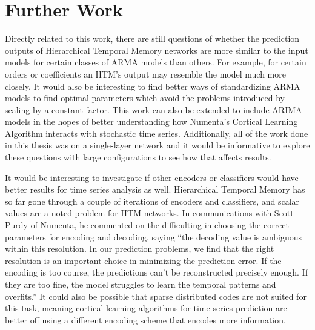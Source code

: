 \documentclass[oneside,12pt,openany]{book}
\begin{document}
	
	\chapter{Further Work}

	Directly related to this work, there are still questions of whether the prediction outputs of Hierarchical Temporal Memory networks are more similar to the input models for certain classes of ARMA models than others. For example, for certain orders or coefficients an HTM's output may resemble the model much more closely. It would also be interesting to find better ways of standardizing ARMA models to find optimal parameters which avoid the problems introduced by scaling by a constant factor. This work can also be extended to include ARIMA models in the hopes of better understanding how Numenta's Cortical Learning Algorithm interacts with stochastic time series. Additionally, all of the work done in this thesis was on a single-layer network and it would be informative to explore these questions with large configurations to see how that affects results.
    
    It would be interesting to investigate if other encoders or classifiers would have better results for time series analysis as well. Hierarchical Temporal Memory has so far gone through a couple of iterations of encoders and classifiers, and scalar values are a noted problem for HTM networks. In communications with Scott Purdy of Numenta, he commented on the difficulting in choosing the correct parameters for encoding and decoding, saying ``the decoding value is ambiguous within this resolution. In our prediction problems, we find that the right resolution is an important choice in minimizing the prediction error. If the encoding is too course, the predictions can't be reconstructed precisely enough. If they are too fine, the model struggles to learn the temporal patterns and overfits.'' It could also be possible that sparse distributed codes are not suited for this task, meaning cortical learning algorithms for time series prediction are better off using a different encoding scheme that encodes more information.
	
	\nocite{*}  %
	{}
	
\end{document}
